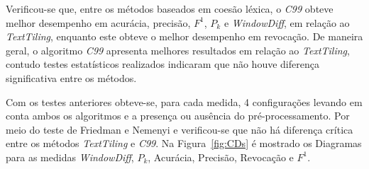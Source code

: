 Verificou-se que, entre os métodos baseados em coesão léxica, o \textit{C99} obteve melhor desempenho em acurácia, precisão, $F^1$, $P_k$ e \textit{WindowDiff}, em relação ao \textit{TextTiling}, enquanto este obteve o melhor desempenho em revocação. De maneira geral, o algoritmo \textit{C99} apresenta melhores resultados em relação ao \textit{TextTiling}, contudo testes estatísticos realizados indicaram que não houve diferença significativa entre os métodos. 




Com os testes anteriores obteve-se, para cada medida, 4 configurações levando em conta ambos os algoritmos e a presença ou ausência do pré-processamento. Por meio do teste de Friedman e Nemenyi e verificou-se que não há diferença crítica entre os métodos \textit{TextTiling} e \textit{C99}. Na Figura~\ref{fig:CDs} é mostrado os Diagramas para as medidas \textit{WindowDiff}, $P_k$, Acurácia, Precisão, Revocação e $F^1$.	

